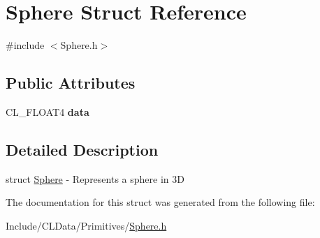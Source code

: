 \hypertarget{struct_sphere}{}\section{Sphere Struct Reference}
\label{struct_sphere}


{\ttfamily \#include $<$Sphere.\+h$>$}

\subsection*{Public Attributes}
\begin{DoxyCompactItemize}
\item 
C\+L\+\_\+\+F\+L\+O\+A\+T4 {\bfseries data}\hypertarget{struct_sphere_abeacdd8485f6bbe5685ce6669856ee07}{}\label{struct_sphere_abeacdd8485f6bbe5685ce6669856ee07}

\end{DoxyCompactItemize}


\subsection{Detailed Description}
struct \hyperlink{struct_sphere}{Sphere} -\/ Represents a sphere in 3D 

The documentation for this struct was generated from the following file\+:\begin{DoxyCompactItemize}
\item 
Include/\+C\+L\+Data/\+Primitives/\hyperlink{_sphere_8h}{Sphere.\+h}\end{DoxyCompactItemize}
